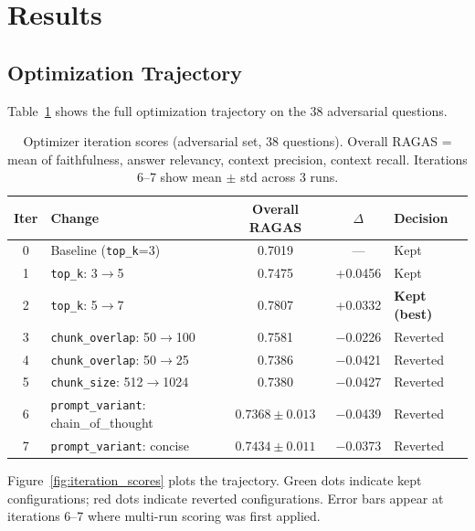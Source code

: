 \documentclass[11pt,a4paper]{article}
\begin{document}
\section{Results}

\subsection{Optimization Trajectory}

Table~\ref{tab:trajectory} shows the full optimization trajectory on the 38
adversarial questions.

\begin{table}[ht]
\centering
\caption{Optimizer iteration scores (adversarial set, 38 questions).
Overall RAGAS = mean of faithfulness, answer relevancy, context precision,
context recall. Iterations 6--7 show mean $\pm$ std across 3 runs.}
\label{tab:trajectory}
\begin{tabular}{clccl}
\toprule
\textbf{Iter} & \textbf{Change} & \textbf{Overall RAGAS} & \textbf{$\Delta$} & \textbf{Decision} \\
\midrule
0 & Baseline (\texttt{top\_k}=3)           & 0.7019              & ---     & Kept \\
1 & \texttt{top\_k}: 3$\to$5              & 0.7475              & +0.0456 & Kept \\
2 & \texttt{top\_k}: 5$\to$7              & 0.7807              & +0.0332 & \textbf{Kept (best)} \\
3 & \texttt{chunk\_overlap}: 50$\to$100   & 0.7581              & $-$0.0226 & Reverted \\
4 & \texttt{chunk\_overlap}: 50$\to$25    & 0.7386              & $-$0.0421 & Reverted \\
5 & \texttt{chunk\_size}: 512$\to$1024    & 0.7380              & $-$0.0427 & Reverted \\
6 & \texttt{prompt\_variant}: chain\_of\_thought & $0.7368 \pm 0.013$ & $-$0.0439 & Reverted \\
7 & \texttt{prompt\_variant}: concise     & $0.7434 \pm 0.011$ & $-$0.0373 & Reverted \\
\bottomrule
\end{tabular}
\end{table}

Figure~\ref{fig:iteration_scores} plots the trajectory. Green dots indicate
kept configurations; red dots indicate reverted configurations. Error bars
appear at iterations 6--7 where multi-run scoring was first applied.
\end{document}
